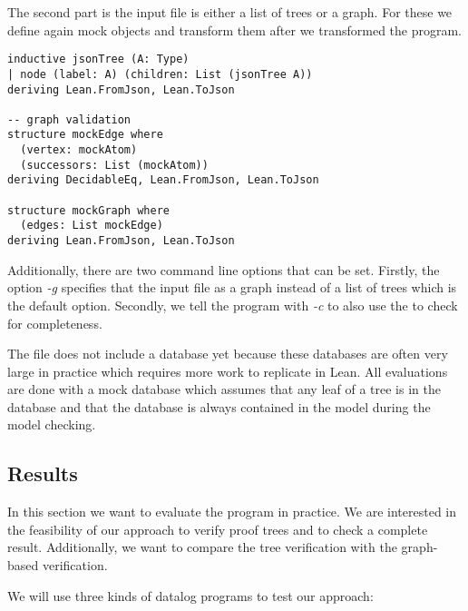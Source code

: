The second part is the input file is either a list of trees or a graph. For these we define again mock objects and transform them after we transformed the program.

\begin{lstlisting}
inductive jsonTree (A: Type)
| node (label: A) (children: List (jsonTree A))
deriving Lean.FromJson, Lean.ToJson

-- graph validation
structure mockEdge where
  (vertex: mockAtom)
  (successors: List (mockAtom))
deriving DecidableEq, Lean.FromJson, Lean.ToJson

structure mockGraph where
  (edges: List mockEdge)
deriving Lean.FromJson, Lean.ToJson
\end{lstlisting}

Additionally, there are two command line options that can be set. Firstly, the option \textit{-g} specifies that the input file as a graph instead of a list of trees which is the default option. Secondly, we tell the program with \textit{-c} to also use the \modelChecker to check for completeness.

The file does not include a database yet because these databases are often very large in practice which requires more work to replicate in Lean. All evaluations are done with a mock database which assumes that any leaf of a tree is in the database and that the database is always contained in the model during the model checking. 


\subsection{Results}

In this section we want to evaluate the program in practice. We are interested in the feasibility of our approach to verify proof trees and to check a complete result. Additionally, we want to compare the tree verification with the graph-based verification.

We will use three kinds of datalog programs to test our approach:


